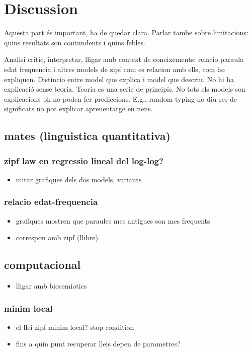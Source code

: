 \chapter{Discussion}
\label{cha:discussion}
Aquesta part és important, ha de quedar clara. Parlar tambe sobre limitacions: quins resultats son contundents i quins febles.

Analisi critic, interpretar, lligar amb context de coneixements: relacio paraula edat frequencia i altres models de zipf com es relacion amb ells, com ho expliquen. Distincio entre model que explica i model que descriu. No hi ha explicació sense teoria. Teoria es una serie de principis. No tots els models son explicacions pk no poden fer prediccions. E.g., random typing no diu res de significats no pot explicar aprenentatge en nens.
\section{mates (linguistica quantitativa)}
\subsection{zipf law en regressio lineal del log-log?}
\begin{itemize}
\item mirar grafiques dels dos models, variants
\end{itemize}
\subsection{relacio edat-frequencia}
\begin{itemize}
\item grafiques mostren que paraules mes antigues son mes frequents
\item correspon amb zipf (llibre)
\end{itemize}
\section{computacional}
\begin{itemize}
\item lligar amb biosemiotics
\end{itemize}
\subsection{minim local}
\begin{itemize}
\item el llei zipf minim local? stop condition
\item fins a quin punt recuperar lleis depen de parametres?
\end{itemize}
